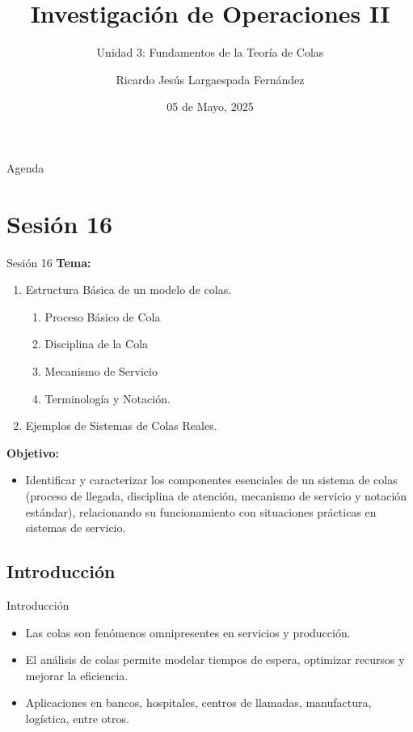 \documentclass{beamer}
\title{Investigación de Operaciones II}
\subtitle{Unidad 3: Fundamentos de la Teoría de Colas}
\author{Ricardo Jesús Largaespada Fernández}
\institute{Ingeniería de Sistemas, DACTIC, UNI}
\date{05 de Mayo, 2025}
\begin{document}
\frame{\titlepage}

\begin{frame}{Agenda}
    \tableofcontents
\end{frame}

\section{Sesión 16}

\begin{frame}{Sesión 16}
\textbf{Tema:}
\begin{enumerate}
    \item Estructura Básica de un modelo de colas.
    \begin{enumerate}
\item Proceso Básico de Cola
\item Disciplina de la Cola
\item Mecanismo de Servicio
\item Terminología y Notación.
\end{enumerate}
    \item Ejemplos de Sistemas de Colas Reales.
\end{enumerate}

\textbf{Objetivo:}
\begin{itemize}
    \item Identificar y caracterizar los componentes esenciales de un sistema de colas (proceso de llegada, disciplina de atención, mecanismo de servicio y notación estándar), relacionando su funcionamiento con situaciones prácticas en sistemas de servicio.
\end{itemize}
\end{frame}

\subsection{Introducción}
\begin{frame}{Introducción}
    \begin{itemize}
        \item Las colas son fenómenos omnipresentes en servicios y producción.
        \item El análisis de colas permite modelar tiempos de espera, optimizar recursos y mejorar la eficiencia.
        \item Aplicaciones en bancos, hospitales, centros de llamadas, manufactura, logística, entre otros.
    \end{itemize}
\end{frame}
\end{document}
